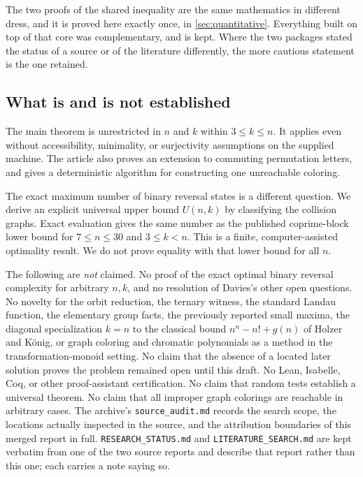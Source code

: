 \documentclass[11pt,a4paper]{article}
\numberwithin{equation}{section}
\theoremstyle{definition}
\theoremstyle{remark}
\begin{document}
The two proofs of the shared inequality are the same mathematics in
different dress, and it is proved here exactly once, in
\cref{sec:quantitative}. Everything built on top of that core was
complementary, and is kept. Where the two packages stated the status of a
source or of the literature differently, the more cautious statement is the
one retained.

\subsection{What is and is not established}

The main theorem is unrestricted in $n$ and $k$ within $3\le k\le n$.
It applies even without accessibility, minimality, or surjectivity
assumptions on the supplied machine. The article also proves an extension to
commuting permutation letters, and gives a deterministic algorithm for
constructing one unreachable coloring.

The exact maximum number of binary reversal states is a different question.
We derive an explicit universal upper bound $U(n,k)$ by classifying the
collision graphs. Exact evaluation gives the same number as the published
coprime-block lower bound for $7\le n\le30$ and $3\le k<n$. This is a
finite, computer-assisted optimality result. We do not prove equality with
that lower bound for all $n$.

The following are \emph{not} claimed. No proof of the exact optimal binary
reversal complexity for arbitrary $n,k$, and no resolution of Davies's other
open questions. No novelty for the orbit reduction, the ternary witness, the
standard Landau function, the elementary group facts, the previously
reported small maxima, the diagonal specialization $k=n$ to the classical
bound $n^n-n!+g(n)$ of Holzer and K\"onig, or graph coloring and chromatic
polynomials as a method in the transformation-monoid setting. No claim that
the absence of a located later solution proves the problem remained open
until this draft. No Lean, Isabelle, Coq, or other proof-assistant
certification. No claim that random tests establish a universal theorem.
No claim that all improper graph colorings are reachable in arbitrary cases.
The archive's \texttt{source\_audit.md} records the search scope, the locations
actually inspected in the source, and the attribution boundaries of this merged
report in full. \texttt{RESEARCH\_STATUS.md} and \texttt{LITERATURE\_SEARCH.md}
are kept verbatim from one of the two source reports and describe that report
rather than this one; each carries a note saying so.
\end{document}
